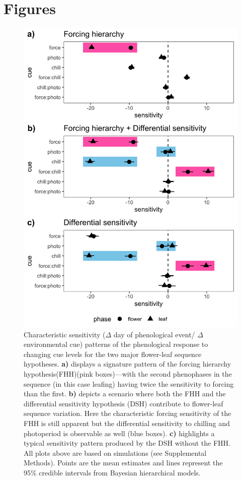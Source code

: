 \documentclass[11pt]{article}\usepackage[]{graphicx}\usepackage[]{color}
\begin{document}
\section*{Figures}
\begin{figure}[h!]
    \centering
         \includegraphics[width=.7\textwidth]{..//Plots/Flobuds_manuscript_figs/simulations.png}
    \caption{Characteristic sensitivity ($\Delta$ day of phenological event/ $\Delta$ environmental cue) patterns of the phenological response to changing cue levels for the two major flower-leaf sequence hypotheses.  \textbf{a)} displays a signature pattern of the forcing hierarchy hypothesis(FHH)(pink boxes)---with the second phenophases in the sequence (in this case leafing) having twice the sensitivity to forcing than the first. \textbf{b)} depicts a scenario where both the FHH and the differential sensitivity hypothesis (DSH) contribute to flower-leaf sequence variation. Here the characteristic forcing sensitivity of the FHH is still apparent but the differential sensitivity to chilling and photoperiod is observable as well (blue boxes). \textbf{c)} highlights a typical sensitivity pattern produced by the DSH without the FHH. All plots above are based on simulations (see Supplemental Methods). Points are the mean estimates and lines represent the 95\% credible intervals from Bayesian hierarchical models. } 
    \label{fig:simulations}
\end{figure}
\pagebreak
\end{document}
